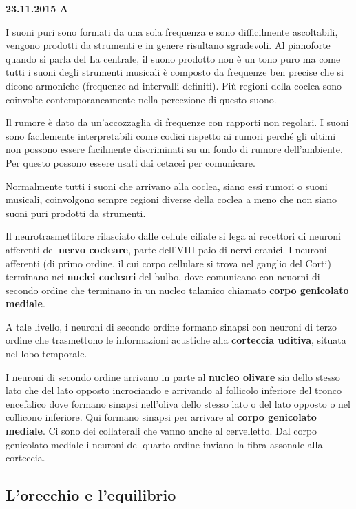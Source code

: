 \documentclass[]{article}
\begin{document}
\textbf{23.11.2015 A}

I suoni puri sono formati da una sola frequenza e sono difficilmente
ascoltabili, vengono prodotti da strumenti e in genere risultano
sgradevoli. Al pianoforte quando si parla del La centrale, il suono
prodotto non è un tono puro ma come tutti i suoni degli strumenti
musicali è composto da frequenze ben precise che si dicono armoniche
(frequenze ad intervalli definiti). Più regioni della coclea sono
coinvolte contemporaneamente nella percezione di questo suono.

Il rumore è dato da un'accozzaglia di frequenze con rapporti non
regolari. I suoni sono facilemente interpretabili come codici rispetto
ai rumori perché gli ultimi non possono essere facilmente discriminati
su un fondo di rumore dell'ambiente. Per questo possono essere usati dai
cetacei per comunicare.

Normalmente tutti i suoni che arrivano alla coclea, siano essi rumori o
suoni musicali, coinvolgono sempre regioni diverse della coclea a meno
che non siano suoni puri prodotti da strumenti.

Il neurotrasmettitore rilasciato dalle cellule ciliate si lega ai
recettori di neuroni afferenti del \textbf{nervo cocleare}, parte
dell'VIII paio di nervi cranici. I neuroni afferenti (di primo ordine,
il cui corpo cellulare si trova nel ganglio del Corti) terminano nei
\textbf{nuclei cocleari} del bulbo, dove comunicano con neuorni di
secondo ordine che terminano in un nucleo talamico chiamato
\textbf{corpo genicolato mediale}.

A tale livello, i neuroni di secondo ordine formano sinapsi con neuroni
di terzo ordine che trasmettono le informazioni acustiche alla
\textbf{corteccia uditiva}, situata nel lobo temporale.

I neuroni di secondo ordine arrivano in parte al \textbf{nucleo olivare}
sia dello stesso lato che del lato opposto incrociando e arrivando al
follicolo inferiore del tronco encefalico dove formano sinapsi
nell'oliva dello stesso lato o del lato opposto o nel collicono
inferiore. Qui formano sinapsi per arrivare al \textbf{corpo genicolato
mediale}. Ci sono dei collaterali che vanno anche al cervelletto. Dal
corpo genicolato mediale i neuroni del quarto ordine inviano la fibra
assonale alla corteccia.

\subsection{L'orecchio e l'equilibrio}\label{lorecchio-e-lequilibrio}
\end{document}
